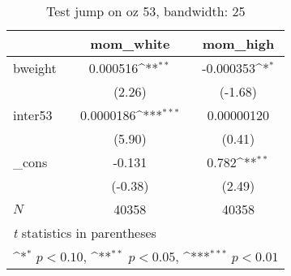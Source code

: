 \begin{table}[htbp]\centering
\def\sym#1{\ifmmode^{#1}\else\(^{#1}\)\fi}
\caption{Test jump on oz 53, bandwidth: 25}
\begin{tabular}{l*{2}{c}}
\hline\hline
            &\multicolumn{1}{c}{mom\_white}&\multicolumn{1}{c}{mom\_high}\\
\hline
bweight     &    0.000516\sym{**} &   -0.000353\sym{*}  \\
            &      (2.26)         &     (-1.68)         \\
[1em]
inter53     &   0.0000186\sym{***}&  0.00000120         \\
            &      (5.90)         &      (0.41)         \\
[1em]
\_cons      &      -0.131         &       0.782\sym{**} \\
            &     (-0.38)         &      (2.49)         \\
\hline
\(N\)       &       40358         &       40358         \\
\hline\hline
\multicolumn{3}{l}{\footnotesize \textit{t} statistics in parentheses}\\
\multicolumn{3}{l}{\footnotesize \sym{*} \(p<0.10\), \sym{**} \(p<0.05\), \sym{***} \(p<0.01\)}\\
\end{tabular}
\end{table}
